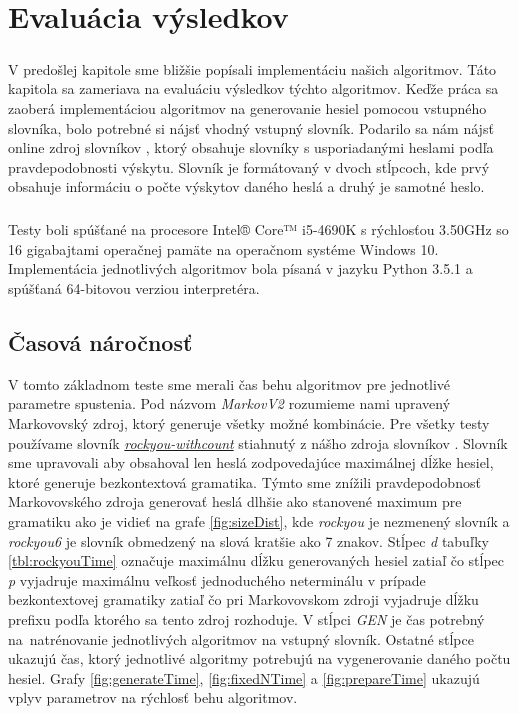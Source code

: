 \chapter{Evaluácia výsledkov}

\paragraph{}
V predošlej kapitole sme bližšie popísali implementáciu našich algoritmov. Táto kapitola sa zameriava na evaluáciu výsledkov týchto algoritmov. Keďže práca sa zaoberá implementáciou algoritmov na generovanie hesiel pomocou vstupného slovníka, bolo potrebné si nájsť vhodný vstupný slovník. Podarilo sa nám nájsť online zdroj slovníkov \cite{dictionaries}, ktorý obsahuje slovníky s usporiadanými heslami podľa pravdepodobnosti výskytu. Slovník je formátovaný v dvoch stĺpcoch, kde prvý obsahuje informáciu o počte výskytov daného heslá a druhý je samotné heslo.

\paragraph{}
Testy boli spúšťané na procesore Intel® Core™ i5-4690K s rýchlosťou 3.50GHz so 16 gigabajtami operačnej pamäte na operačnom systéme Windows 10. Implementácia jednotlivých algoritmov bola písaná v jazyku Python 3.5.1 a spúšťaná 64-bitovou verziou interpretéra.

\section{Časová náročnosť}
\label{sec:time}
V tomto základnom teste sme merali čas behu algoritmov pre jednotlivé parametre spustenia. Pod názvom \emph{MarkovV2} rozumieme nami upravený Markovovský zdroj, ktorý generuje všetky možné kombinácie. Pre všetky testy používame slovník \emph{\href{http://downloads.skullsecurity.org/passwords/rockyou-withcount.txt.bz2}{rockyou-withcount}} stiahnutý z nášho zdroja slovníkov \cite{dictionaries}. Slovník sme upravovali aby obsahoval len heslá zodpovedajúce maximálnej dĺžke hesiel, ktoré generuje bezkontextová gramatika. Týmto sme znížili pravdepodobnosť Markovovského zdroja generovať heslá dlhšie ako stanovené maximum pre gramatiku ako je vidieť na grafe \ref{fig:sizeDist}, kde \emph{rockyou} je nezmenený slovník a \emph{rockyou6} je slovník obmedzený na slová kratšie ako 7 znakov. Stĺpec \emph{d} tabuľky \ref{tbl:rockyouTime} označuje maximálnu dĺžku generovaných hesiel zatiaľ čo stĺpec \emph{p} vyjadruje maximálnu veľkosť jednoduchého neterminálu v prípade bezkontextovej gramatiky zatiaľ čo pri Markovovskom zdroji vyjadruje dĺžku prefixu podľa ktorého sa tento zdroj rozhoduje. V stĺpci \emph{GEN} je čas potrebný na~natrénovanie jednotlivých algoritmov na vstupný slovník. Ostatné stĺpce ukazujú čas, ktorý jednotlivé algoritmy potrebujú na vygenerovanie daného počtu hesiel. Grafy \ref{fig:generateTime}, \ref{fig:fixedNTime} a \ref{fig:prepareTime} ukazujú vplyv parametrov na rýchlosť behu algoritmov. 

